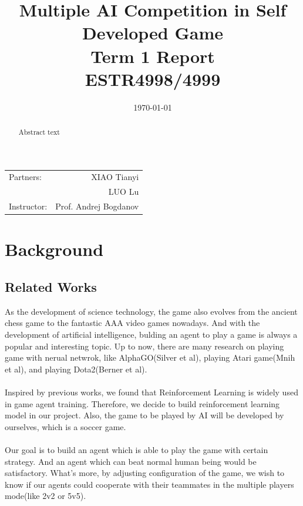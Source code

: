 \documentclass[14pt]{extarticle}
\title{\large Multiple AI Competition in Self Developed Game \\ Term 1 Report \\ ESTR4998/4999} %
\date{\today} %
\begin{document}
\maketitle %

\begin{center}
\begin{tabular}{l r}
Partners: & XIAO Tianyi \\ %
& LUO Lu \\
Instructor: & Prof. Andrej Bogdanov %
\end{tabular}
\end{center}
\newpage



\begin{abstract}
	Abstract text
\end{abstract}
 

\section{Background}

\subsection{Related Works}
As the development of science technology, the game also evolves from the ancient chess game to the fantastic AAA video games nowadays. And with the development of artificial intelligence, bulding an agent to play a game is always a popular and interesting topic. Up to now, there are many research on playing game with nerual netwrok, like AlphaGO(Silver et al), playing Atari game(Mnih et al), and playing Dota2(Berner et al).\\\\
Inspired by previous works, we found that Reinforcement Learning is widely used in game agent training. Therefore, we decide to build reinforcement learning model in our project. Also, the game to be played by AI will be developed by ourselves, which is a soccer game.\\\\
Our goal is to build an agent which is able to play the game with certain strategy. And an agent which can beat normal human being would be satisfactory. What's more, by adjusting configuration of the game, we wish to know if our agents could cooperate with their teammates in the multiple players mode(like 2v2 or 5v5).
\end{document}
